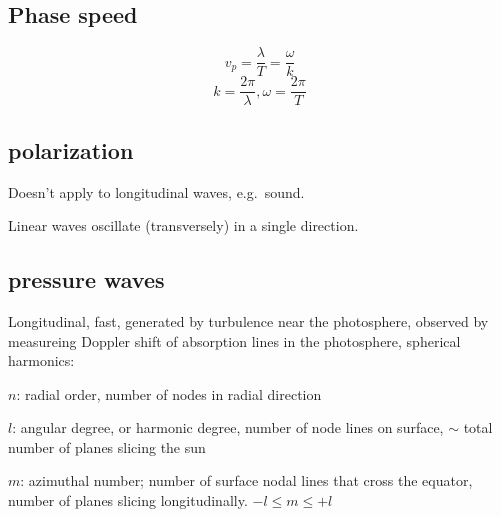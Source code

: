 \documentclass[12pt]{article}
\begin{document}
\subsection*{Phase speed}
$$ v_p = \frac{\lambda}{T} = \frac{\omega}{k} $$
$$ k = \frac{2\pi}{\lambda}, \omega = \frac{2\pi}{T} $$

\subsection*{polarization}
\begin{itemize*}
    \item Doesn't apply to longitudinal waves, e.g.\ sound.
    \item Linear waves oscillate (transversely) in a single direction.
\end{itemize*}

\subsection*{pressure waves}
Longitudinal, fast, generated by turbulence near the photosphere,
observed by measureing Doppler shift of absorption lines in the
photosphere, spherical harmonics:
\begin{itemize*}
    \item $n$: radial order, number of nodes in radial direction
    \item $l$: angular degree, or harmonic degree,
        number of node lines on surface,
        $\sim$ total number of planes slicing the sun
    \item $m$: azimuthal number;
        number of surface nodal lines that cross the equator,
        number of planes slicing longitudinally. $-l\leq m\leq +l$
\end{itemize*}
\end{document}
